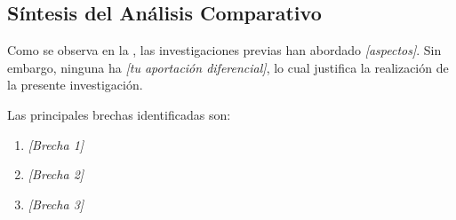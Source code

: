 \subsection{Síntesis del Análisis Comparativo}
\label{subsec:sintesis_comparativa}

Como se observa en la , las investigaciones previas han abordado \textit{[aspectos]}. Sin embargo, ninguna ha \textit{[tu aportación diferencial]}, lo cual justifica la realización de la presente investigación.

Las principales brechas identificadas son:
\begin{enumerate}
    \item \textit{[Brecha 1]}
    \item \textit{[Brecha 2]}
    \item \textit{[Brecha 3]}
\end{enumerate}

% 
%
%
%
